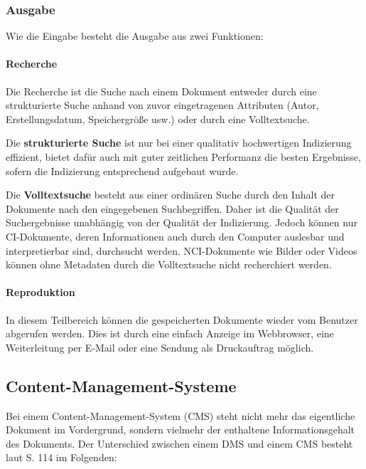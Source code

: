 \subsubsection{Ausgabe}
Wie die Eingabe besteht die Ausgabe aus zwei Funktionen:

\paragraph{Recherche}
Die Recherche ist die Suche nach einem Dokument entweder durch eine strukturierte Suche anhand von zuvor eingetragenen Attributen (Autor, Erstellungsdatum, Speichergröße usw.) oder durch eine Volltextsuche.

Die \textbf{strukturierte Suche} ist nur bei einer qualitativ hochwertigen Indizierung effizient, bietet dafür auch mit guter zeitlichen Performanz die besten Ergebnisse, sofern die Indizierung entsprechend aufgebaut wurde.

Die \textbf{Volltextsuche} besteht aus einer ordinären Suche durch den Inhalt der Dokumente nach den eingegebenen Suchbegriffen.
Daher ist die Qualität der Suchergebnisse unabhängig von der Qualität der Indizierung.
Jedoch können nur \gls{CI}-Dokumente, deren Informationen auch durch den Computer auslesbar und interpretierbar sind, durchsucht werden.
\gls{NCI}-Dokumente wie Bilder oder Videos können ohne Metadaten durch die Volltextsuche nicht recherchiert werden.

\paragraph{Reproduktion}
In diesem Teilbereich können die gespeicherten Dokumente wieder vom Benutzer abgerufen werden.
Dies ist durch eine einfach Anzeige im Webbrowser, eine Weiterleitung per E-Mail oder eine Sendung als Druckauftrag möglich.

\newpage

\subsection{Content-Management-Systeme}
Bei einem Content-Management-System (\gls{CMS})  steht nicht mehr das eigentliche Dokument im Vordergrund, sondern vielmehr der enthaltene Informationsgehalt des Dokuments. %
Der Unterschied zwischen einem \gls{DMS} und einem \gls{CMS} besteht laut \cite{DMS08} S. 114 im Folgenden:


